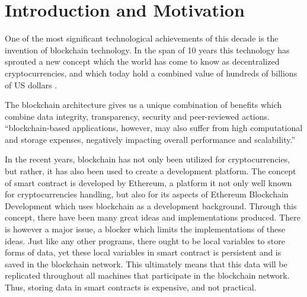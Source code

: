 \section{Introduction and Motivation}

One of the most significant technological achievements of this decade is the invention of blockchain technology. In the span of 10 years this technology has sprouted a new concept which the world has come to know as decentralized cryptocurrencies, and which today hold a combined value of hundreds of billions of US dollars \cite{relatedWork40}.

The blockchain architecture gives us a unique combination of benefits which combine data integrity, transparency, security and peer-reviewed actions. 
“blockchain-based applications, however, may also suffer from high computational and storage expenses, negatively impacting overall performance and scalability.” \cite{Eberhardt2017}

In the recent years, blockchain has not only been utilized for cryptocurrencies, but rather, it has also been used to create a development platform. The concept of smart contract is developed by Ethereum, a platform it not only well known for cryptocurrencies handling, but also for its aspects of Ethereum Blockchain Development which uses blockchain as a development background. Through this concept, there have been many great ideas and implementations produced. There is however a major issue, a blocker which limits the implementations of these ideas. Just like any other programs, there ought to be local variables to store forms of data, yet these local variables in smart contract is persistent and is saved in the blockchain network. This ultimately means that this data will be replicated throughout all machines that participate in the blockchain network. Thus, storing data in smart contracts is expensive, and not practical.



